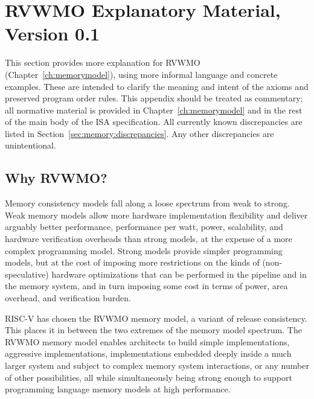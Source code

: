 \makeatletter
\gdef\SetFigFont#1#2#3#4#5{%
  \reset@font\fontsize{12}{#2pt}%
  \fontfamily{\sfdefault}\fontseries{#4}\fontshape{#5}%
  \selectfont}
\makeatother

\chapter{RVWMO Explanatory Material, Version 0.1}
\label{sec:memorymodelexplanation}
This section provides more explanation for RVWMO (Chapter~\ref{ch:memorymodel}), using more informal language and concrete examples.
These are intended to clarify the meaning and intent of the axioms and preserved program order rules.
This appendix should be treated as commentary; all normative material is provided in Chapter~\ref{ch:memorymodel} and in the rest of the main body of the ISA specification.
All currently known discrepancies are listed in Section~\ref{sec:memory:discrepancies}.
Any other discrepancies are unintentional.

\section{Why RVWMO?}
\label{sec:whyrvwmo}

Memory consistency models fall along a loose spectrum from weak to strong.
Weak memory models allow more hardware implementation flexibility and deliver arguably better performance, performance per watt, power, scalability, and hardware verification overheads than strong models, at the expense of a more complex programming model.
Strong models provide simpler programming models, but at the cost of imposing more restrictions on the kinds of (non-speculative) hardware optimizations that can be performed in the pipeline and in the memory system, and in turn imposing some cost in terms of power, area overhead, and verification burden.

RISC-V has chosen the RVWMO memory model, a variant of release consistency.
This places it in between the two extremes of the memory model spectrum.
The RVWMO memory model enables architects to build simple implementations, aggressive implementations, implementations embedded deeply inside a much larger system and subject to complex memory system interactions, or any number of other possibilities, all while simultaneously being strong enough to support programming language memory models at high performance.

